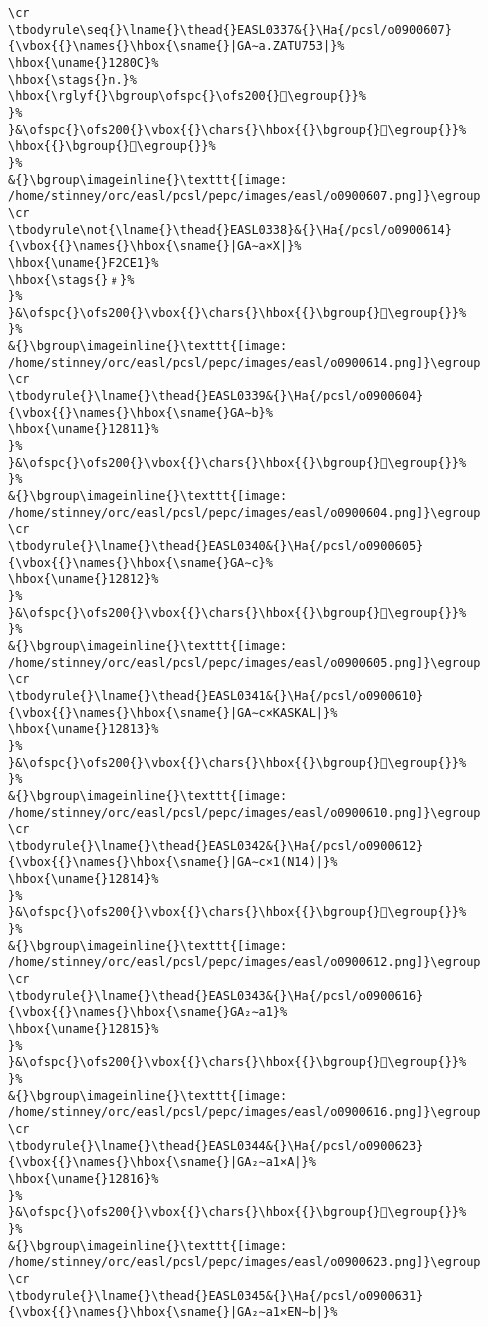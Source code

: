 \begin{verbatim}
\cr
\tbodyrule\seq{}\lname{}\thead{}EASL0337&{}\Ha{/pcsl/o0900607}{\vbox{{}\names{}\hbox{\sname{}|GA∼a.ZATU753|}%
\hbox{\uname{}1280C}%
\hbox{\stags{}n.}%
\hbox{\rglyf{}\bgroup\ofspc{}\ofs200{}𒠌\egroup{}}%
}%
}&\ofspc{}\ofs200{}\vbox{{}\chars{}\hbox{{}\bgroup{}𒠌\egroup{}}%
\hbox{{}\bgroup{}𒠐\egroup{}}%
}%
&{}\bgroup\imageinline{}\texttt{[image: /home/stinney/orc/easl/pcsl/pepc/images/easl/o0900607.png]}\egroup
\cr
\tbodyrule\not{\lname{}\thead{}EASL0338}&{}\Ha{/pcsl/o0900614}{\vbox{{}\names{}\hbox{\sname{}|GA∼a×X|}%
\hbox{\uname{}F2CE1}%
\hbox{\stags{}﹟}%
}%
}&\ofspc{}\ofs200{}\vbox{{}\chars{}\hbox{{}\bgroup{}󲳡\egroup{}}%
}%
&{}\bgroup\imageinline{}\texttt{[image: /home/stinney/orc/easl/pcsl/pepc/images/easl/o0900614.png]}\egroup
\cr
\tbodyrule{}\lname{}\thead{}EASL0339&{}\Ha{/pcsl/o0900604}{\vbox{{}\names{}\hbox{\sname{}GA∼b}%
\hbox{\uname{}12811}%
}%
}&\ofspc{}\ofs200{}\vbox{{}\chars{}\hbox{{}\bgroup{}𒠑\egroup{}}%
}%
&{}\bgroup\imageinline{}\texttt{[image: /home/stinney/orc/easl/pcsl/pepc/images/easl/o0900604.png]}\egroup
\cr
\tbodyrule{}\lname{}\thead{}EASL0340&{}\Ha{/pcsl/o0900605}{\vbox{{}\names{}\hbox{\sname{}GA∼c}%
\hbox{\uname{}12812}%
}%
}&\ofspc{}\ofs200{}\vbox{{}\chars{}\hbox{{}\bgroup{}𒠒\egroup{}}%
}%
&{}\bgroup\imageinline{}\texttt{[image: /home/stinney/orc/easl/pcsl/pepc/images/easl/o0900605.png]}\egroup
\cr
\tbodyrule{}\lname{}\thead{}EASL0341&{}\Ha{/pcsl/o0900610}{\vbox{{}\names{}\hbox{\sname{}|GA∼c×KASKAL|}%
\hbox{\uname{}12813}%
}%
}&\ofspc{}\ofs200{}\vbox{{}\chars{}\hbox{{}\bgroup{}𒠓\egroup{}}%
}%
&{}\bgroup\imageinline{}\texttt{[image: /home/stinney/orc/easl/pcsl/pepc/images/easl/o0900610.png]}\egroup
\cr
\tbodyrule{}\lname{}\thead{}EASL0342&{}\Ha{/pcsl/o0900612}{\vbox{{}\names{}\hbox{\sname{}|GA∼c×1(N14)|}%
\hbox{\uname{}12814}%
}%
}&\ofspc{}\ofs200{}\vbox{{}\chars{}\hbox{{}\bgroup{}𒠔\egroup{}}%
}%
&{}\bgroup\imageinline{}\texttt{[image: /home/stinney/orc/easl/pcsl/pepc/images/easl/o0900612.png]}\egroup
\cr
\tbodyrule{}\lname{}\thead{}EASL0343&{}\Ha{/pcsl/o0900616}{\vbox{{}\names{}\hbox{\sname{}GA₂∼a1}%
\hbox{\uname{}12815}%
}%
}&\ofspc{}\ofs200{}\vbox{{}\chars{}\hbox{{}\bgroup{}𒠕\egroup{}}%
}%
&{}\bgroup\imageinline{}\texttt{[image: /home/stinney/orc/easl/pcsl/pepc/images/easl/o0900616.png]}\egroup
\cr
\tbodyrule{}\lname{}\thead{}EASL0344&{}\Ha{/pcsl/o0900623}{\vbox{{}\names{}\hbox{\sname{}|GA₂∼a1×A|}%
\hbox{\uname{}12816}%
}%
}&\ofspc{}\ofs200{}\vbox{{}\chars{}\hbox{{}\bgroup{}𒠖\egroup{}}%
}%
&{}\bgroup\imageinline{}\texttt{[image: /home/stinney/orc/easl/pcsl/pepc/images/easl/o0900623.png]}\egroup
\cr
\tbodyrule{}\lname{}\thead{}EASL0345&{}\Ha{/pcsl/o0900631}{\vbox{{}\names{}\hbox{\sname{}|GA₂∼a1×EN∼b|}%

\end{verbatim}
